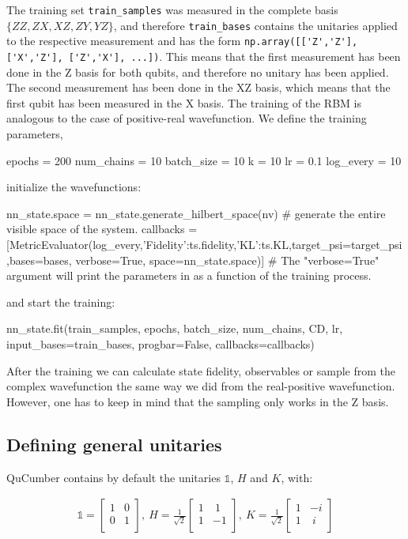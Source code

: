 \documentclass[submission, Phys]{SciPost}
\begin{document}
The training set \verb|train_samples| was measured in the complete basis $\{ZZ, ZX, XZ, ZY, YZ \}$, and therefore \verb|train_bases| contains the unitaries applied to the respective measurement and has the form \verb|np.array([['Z','Z'], ['X','Z'], ['Z','X'], ...])|.
This means that the first measurement has been done in the Z basis for both qubits,
and therefore no unitary has been applied. The second measurement has been done in the XZ basis,
which means that the first qubit has been measured in the X basis. The training of the RBM is analogous to the case of positive-real wavefunction.
We define the training parameters,

\begin{python}
	epochs   = 200
	num_chains = 10
	batch_size = 10
	k     = 10
	lr     = 0.1
	log_every = 10
\end{python}

initialize the wavefunctions:

\begin{python}
nn_state.space = nn_state.generate_hilbert_space(nv) # generate the entire visible space of the system.
callbacks      = [MetricEvaluator(log_every,{'Fidelity':ts.fidelity,'KL':ts.KL},target_psi=target_psi,bases=bases,
                                  verbose=True, space=nn_state.space)]
# The "verbose=True" argument will print the parameters in { } as a function of the training process.
\end{python}

and start the training:

\begin{python}
nn_state.fit(train_samples, epochs, batch_size, num_chains, CD,
       lr, input_bases=train_bases, progbar=False, callbacks=callbacks)
\end{python}

After the training we can calculate state fidelity, observables or sample from the complex wavefunction
the same way we did from the real-positive wavefunction. However, one has to keep in mind that the sampling only works in the Z basis.

\subsection{Defining general unitaries}

QuCumber contains by default the unitaries $\mathds{1}$, $H$ and $K$, with:

\begin{align}
	\mathds{1} =
	\begin{bmatrix}
		1 & 0 \\
		0 & 1 \\
	\end{bmatrix},~
	H = \frac{1}{\sqrt{2}}
	\begin{bmatrix}
		1 & ~1 \\
		1 & -1 \\
	\end{bmatrix},~
	K = \frac{1}{\sqrt{2}}
	\begin{bmatrix}
		1 & -i \\
		1 & ~i \\
	\end{bmatrix}
\end{align}
\end{document}
